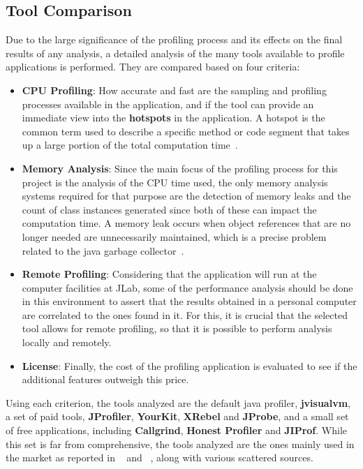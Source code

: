 \subsection{Tool Comparison} \label{ssec:prof_tools}
Due to the large significance of the profiling process and its effects on the final results of any analysis, a detailed analysis of the many tools available to profile applications is performed.
They are compared based on four criteria:

    \begin{itemize}
        \item \textbf{CPU Profiling}: How accurate and fast are the sampling and profiling processes available in the application, and if the tool can provide an immediate view into the \textbf{hotspots} in the application.
        A hotspot is the common term used to describe a specific method or code segment that takes up a large portion of the total computation time~\cite{hunt2011java}.
        
        \item \textbf{Memory Analysis}: Since the main focus of the profiling process for this project is the analysis of the CPU time used, the only memory analysis systems required for that purpose are the detection of memory leaks and the count of class instances generated since both of these can impact the computation time.
        A memory leak occurs when object references that are no longer needed are unnecessarily maintained, which is a precise problem related to the java garbage collector~\cite{xu2008precise}.
        
        \item \textbf{Remote Profiling}: Considering that the application will run at the computer facilities at JLab, some of the performance analysis should be done in this environment to assert that the results obtained in a personal computer are correlated to the ones found in it.
        For this, it is crucial that the selected tool allows for remote profiling, so that it is possible to perform analysis locally and remotely.
        
        \item \textbf{License}: Finally, the cost of the profiling application is evaluated to see if the additional features outweigh this price.
    \end{itemize}

\newpage

Using each criterion, the tools analyzed are the default java profiler, \textbf{jvisualvm}, a set of paid tools, \textbf{JProfiler}, \textbf{YourKit}, \textbf{XRebel} and \textbf{JProbe}, and a small set of free applications, including \textbf{Callgrind}, \textbf{Honest Profiler} and \textbf{JIProf}.
While this set is far from comprehensive, the tools analyzed are the ones mainly used in the market as reported in ~\cite{maple2015developer} and ~\cite{maple2015top}, along with various scattered sources.

